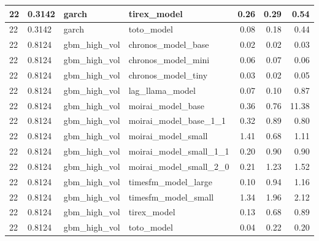 {\begin{tabular}{llllrrr}
22 & 0.3142 & garch & tirex\_model & 0.26 & 0.29 & 0.54 \\
\midrule
22 & 0.3142 & garch & toto\_model & 0.08 & 0.18 & 0.44 \\
\midrule
22 & 0.8124 & gbm\_high\_vol & chronos\_model\_base & 0.02 & 0.02 & 0.03 \\
\midrule
22 & 0.8124 & gbm\_high\_vol & chronos\_model\_mini & 0.06 & 0.07 & 0.06 \\
\midrule
22 & 0.8124 & gbm\_high\_vol & chronos\_model\_tiny & 0.03 & 0.02 & 0.05 \\
\midrule
22 & 0.8124 & gbm\_high\_vol & lag\_llama\_model & 0.07 & 0.10 & 0.87 \\
\midrule
22 & 0.8124 & gbm\_high\_vol & moirai\_model\_base & 0.36 & 0.76 & 11.38 \\
\midrule
22 & 0.8124 & gbm\_high\_vol & moirai\_model\_base\_1\_1 & 0.32 & 0.89 & 0.80 \\
\midrule
22 & 0.8124 & gbm\_high\_vol & moirai\_model\_small & 1.41 & 0.68 & 1.11 \\
\midrule
22 & 0.8124 & gbm\_high\_vol & moirai\_model\_small\_1\_1 & 0.20 & 0.90 & 0.90 \\
\midrule
22 & 0.8124 & gbm\_high\_vol & moirai\_model\_small\_2\_0 & 0.21 & 1.23 & 1.52 \\
\midrule
22 & 0.8124 & gbm\_high\_vol & timesfm\_model\_large & 0.10 & 0.94 & 1.16 \\
\midrule
22 & 0.8124 & gbm\_high\_vol & timesfm\_model\_small & 1.34 & 1.96 & 2.12 \\
\midrule
22 & 0.8124 & gbm\_high\_vol & tirex\_model & 0.13 & 0.68 & 0.89 \\
\midrule
22 & 0.8124 & gbm\_high\_vol & toto\_model & 0.04 & 0.22 & 0.20 \\
\bottomrule
\end{tabular}
}